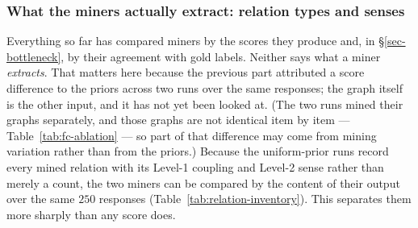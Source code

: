 \subsubsection*{What the miners actually extract: relation types and senses}

Everything so far has compared miners by the scores they produce and, in \S\ref{sec-bottleneck}, by
their agreement with gold labels. Neither says what a miner \emph{extracts}. That matters here because
the previous part attributed a score difference to the priors across two runs over the same responses;
the graph itself is the other input, and it has not yet been looked at. (The two runs mined their graphs
separately, and those graphs are not identical item by item --- Table~\ref{tab:fc-ablation} --- so part of
that difference may come from mining variation rather than from the priors.) Because the uniform-prior runs record
every mined relation with its Level-1 coupling and Level-2 sense rather than merely a count, the two
miners can be compared by the content of their output over the same $250$ responses
(Table~\ref{tab:relation-inventory}). This separates them more sharply than any score does.

